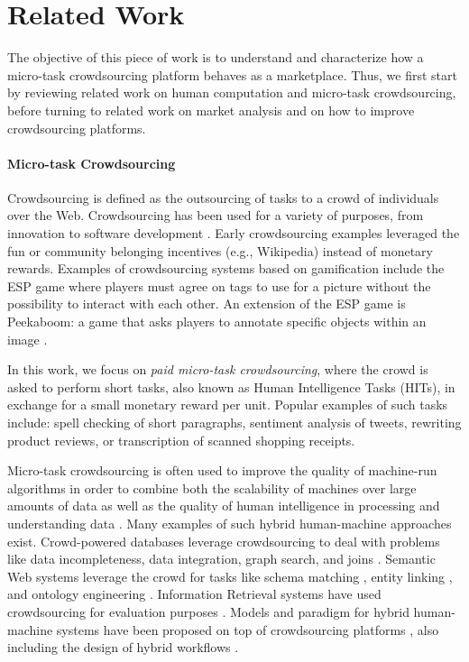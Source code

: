 \section{Related Work}\label{sec:relwork}

The objective of this piece of work is to understand and characterize how a micro-task crowdsourcing platform behaves as a marketplace. Thus, we first start by reviewing related work on human computation and micro-task crowdsourcing, before turning to related work on market analysis and on how to improve crowdsourcing platforms.

\paragraph{Micro-task Crowdsourcing}
Crowdsourcing is defined as the outsourcing of tasks to a crowd of individuals over the Web. Crowdsourcing has been used for a variety of purposes, from innovation to software development \cite{platforms}. 
% 
Early crowdsourcing examples leveraged the fun or community belonging incentives (e.g., Wikipedia) instead of monetary rewards.
Examples of crowdsourcing systems based on gamification include the ESP game \cite{vonAhn:2008:DGP:1378704.1378719} where players must agree on tags to use for a picture without the possibility to interact with each other. 
% 
An extension of the ESP game is Peekaboom: a game that asks players to annotate specific objects within an image \cite{vonAhn:2006:PGL:1124772.1124782}.

In this work, we focus on \emph{paid micro-task crowdsourcing}, where the crowd is asked to perform short tasks, also known as Human Intelligence Tasks (HITs), in exchange for a small monetary reward per unit. Popular examples of such tasks include: spell checking of short paragraphs, sentiment analysis of tweets, rewriting product reviews, or transcription of scanned shopping receipts.

Micro-task crowdsourcing is often used to improve the quality of machine-run algorithms in order to combine both the scalability of machines over large amounts of data as well as the quality of human intelligence in processing and understanding data \cite{vonAhn:2008:DGP:1378704.1378719}. Many examples of such hybrid human-machine approaches exist.
% 
Crowd-powered databases \cite{crowddb} leverage crowdsourcing to deal with problems like data incompleteness, data integration, graph search, and joins \cite{crowder,graphsearch,crowdjoins}.
% 
Semantic Web systems leverage the crowd for tasks like schema matching \cite{crowdmap}, entity linking \cite{zencrowd}, and ontology engineering \cite{bioonto}.
% 
Information Retrieval systems have used crowdsourcing for evaluation purposes \cite{mizzaroalonso}.
% 
Models and paradigm for hybrid human-machine systems have been proposed on top of crowdsourcing platforms \cite{crowdcomputer}, also including the design of hybrid workflows \cite{workflows}.

